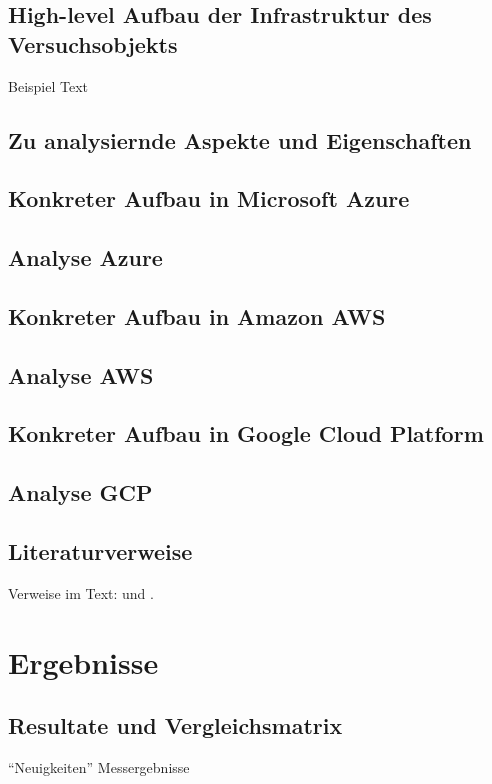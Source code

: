\section{High-level Aufbau der Infrastruktur des Versuchsobjekts}
\label{sec:real-unter}
Beispiel Text

\section{Zu analysiernde Aspekte und Eigenschaften}

\section{Konkreter Aufbau in Microsoft Azure}

\section{Analyse Azure}

\section{Konkreter Aufbau in Amazon AWS}

\section{Analyse AWS}

\section{Konkreter Aufbau in Google Cloud Platform}

\section{Analyse GCP}

\section{Literaturverweise}
\label{sec:real-literatur}

Verweise im Text: \cite{doc:stz} und \cite{doc:gun}.

\chapter{Ergebnisse}
\label{sec:ergeb}


\section{Resultate und Vergleichsmatrix}

\enquote{Neuigkeiten} Messergebnisse
